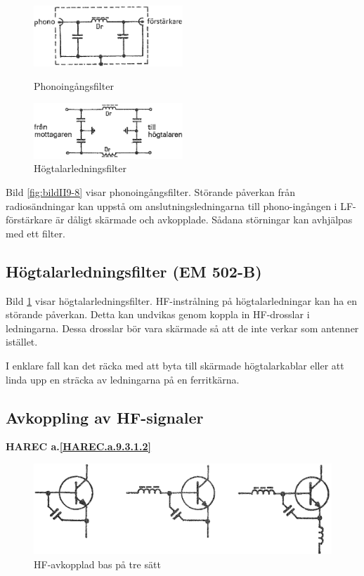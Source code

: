 \begin{figure}
  \includegraphics[width=0.5\textwidth]{images/cropped_pdfs/bild_2_9-08.pdf}
  \caption{Phonoingångsfilter}
  \label{fig:bildII9-8}
  \includegraphics[width=0.5\textwidth]{images/cropped_pdfs/bild_2_9-09.pdf}
  \caption{Högtalarledningsfilter}
  \label{fig:bildII9-9}
\end{figure}

Bild \ref{fig:bildII9-8} visar phonoingångsfilter.
Störande påverkan från radiosändningar kan uppstå om anslutningsledningarna
till phono-ingången i LF-förstärkare är dåligt skärmade och avkopplade.
Sådana störningar kan avhjälpas med ett filter.

\subsection{Högtalarledningsfilter (EM 502-B)}

Bild \ref{fig:bildII9-9} visar högtalarledningsfilter.
HF-instrålning på högtalarledningar kan ha en störande påverkan.
Detta kan undvikas genom koppla in HF-drosslar i ledningarna.
Dessa drosslar bör vara skärmade så att de inte verkar som antenner istället.

I enklare fall kan det räcka med att byta till skärmade högtalarkablar
eller att linda upp en sträcka av ledningarna på en ferritkärna.

\subsection{Avkoppling av HF-signaler}
\textbf{
HAREC a.\ref{HAREC.a.9.3.1.2}\label{myHAREC.a.9.3.1.2}
}

\begin{figure}
  \includegraphics[width=\textwidth]{images/cropped_pdfs/bild_2_9-10b.pdf}
  \caption{HF-avkopplad bas på tre sätt}
  \label{fig:bildII9-10b}
\end{figure}


